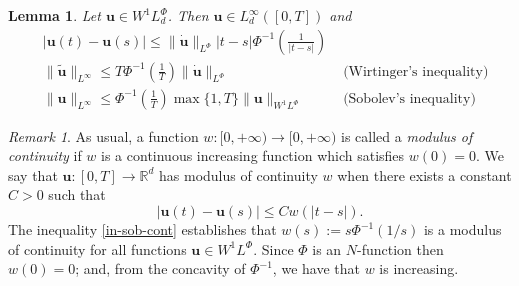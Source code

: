 \documentclass[twoside]{article}
\newtheorem{lem}[thm]{Lemma}
\theoremstyle{remark}
\newtheorem{comentario}{Remark}
\newcommand{\orlnor}{\|_{L^{\Phi}}}
\newcommand{\lphi}{L^{\Phi}}
\newcommand{\wphi}{W^{1}\lphi}
\newcommand{\sobnor}{\|_{W^{1}\lphi}}
\renewcommand{\b}[1]{\boldsymbol{#1}}
\newcommand{\rr}{\mathbb{R}}
\renewcommand{\leq}{\leqslant}
\begin{document}
\begin{lem}\label{inclusion orlicz} Let $\b{u}\in\wphi_d$. Then $\b{u}\in L^{\infty}_d([0,T])$ and
\begin{align}
& \left|\b{u}(t)-\b{u}(s) \right| \leq  \|\b{\dot{u}}\orlnor | t-s|\Phi^{-1}\left(\frac{1}{|t-s|}\right)&\label{in-sob-cont}
\\
& \|\widetilde{\b{u}}\|_{L^{\infty}} \leq T\Phi^{-1}\left(\frac{1}{T}\right)\|\b{\dot u}\orlnor&\text{  (Wirtinger's inequality)}\label{wirtinger}
\\
& \|\b{u}\|_{L^{\infty}} \leq\Phi^{-1}\left(\frac{1}{T}\right)\max\{1,T\}\|\b{u}\sobnor&\text{  (Sobolev's inequality)}\label{sobolev}
\end{align}
\end{lem}
\begin{comentario}
 As usual, a function   $w:[0,+\infty)\to[0,+\infty)$ is called  a \emph{modulus of continuity} if $w$ is a continuous increasing function which satisfies $w(0)=0$. We say that $\b{u}:[0,T]\to\rr^d$  has modulus of continuity $w$  when there exists a constant $C>0$ such that 
\begin{equation}\label{w-holder}|\b{u}(t)-\b{u}(s)|\leq Cw(|t-s|).
\end{equation}
The inequality \eqref{in-sob-cont}
establishes that $w(s):=s\Phi^{-1}(1/s)$ is a modulus of continuity for all functions $\b{u}\in\wphi$. 
Since $\Phi$ is an $N$-function then $w(0)=0$; 
and, from the concavity of $\Phi^{-1}$, we have that $w$ is increasing.
\end{comentario}
\end{document}
